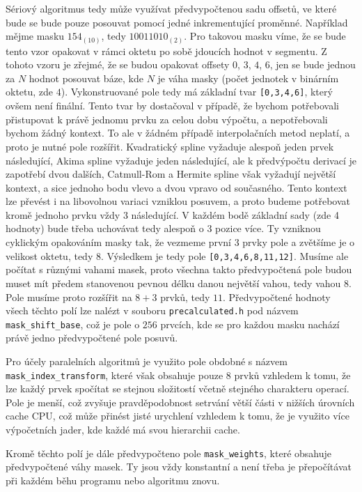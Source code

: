 \documentclass[]{thesiskiv}
\begin{document}
Sériový algoritmus tedy může využívat předvypočtenou sadu offsetů, ve které bude se bude pouze posouvat pomocí jedné inkrementující proměnné. Například mějme masku $154_{(10)}$, tedy $10011010_{(2)}$. Pro takovou masku víme, že se bude tento vzor opakovat v rámci oktetu po sobě jdoucích hodnot v segmentu. Z tohoto vzoru je zřejmé, že se budou opakovat offsety $0$, $3$, $4$, $6$, jen se bude jednou za $N$ hodnot posouvat báze, kde $N$ je váha masky (počet jednotek v binárním oktetu, zde $4$). Vykonstruované pole tedy má základní tvar \texttt{[0,3,4,6]}, který ovšem není finální. Tento tvar by dostačoval v případě, že bychom potřebovali přistupovat k právě jednomu prvku za celou dobu výpočtu, a nepotřebovali bychom žádný kontext. To ale v žádném případě interpolačních metod neplatí, a proto je nutné pole rozšířit. Kvadratický spline vyžaduje alespoň jeden prvek následující, Akima spline vyžaduje jeden následující, ale k předvýpočtu derivací je zapotřebí dvou dalších, Catmull-Rom a Hermite spline však vyžadují největší kontext, a sice jednoho bodu vlevo a dvou vpravo od současného. Tento kontext lze převést i na libovolnou variaci vzniklou posuvem, a proto budeme potřebovat kromě jednoho prvku vždy 3 následující. V každém bodě základní sady (zde 4 hodnoty) bude třeba uchovávat tedy alespoň o 3 pozice více. Ty vzniknou cyklickým opakováním masky tak, že vezmeme první 3 prvky pole a zvětšíme je o velikost oktetu, tedy $8$. Výsledkem je tedy pole \texttt{[0,3,4,6,8,11,12]}. Musíme ale počítat s různými vahami masek, proto všechna takto předvypočtená pole budou muset mít předem stanovenou pevnou délku danou největší vahou, tedy vahou $8$. Pole musíme proto rozšířit na $8 + 3$ prvků, tedy $11$. Předvypočtené hodnoty všech těchto polí lze nalézt v souboru \texttt{precalculated.h} pod názvem \texttt{mask\_shift\_base}, což je pole o $256$ prvcích, kde se pro každou masku nachází právě jedno předvypočtené pole posuvů.

Pro účely paralelních algoritmů je využito pole obdobné s názvem\\ \texttt{mask\_index\_transform}, které však obsahuje pouze $8$ prvků vzhledem k tomu, že lze každý prvek spočítat se stejnou složitostí včetně stejného charakteru operací. Pole je menší, což zvyšuje pravděpodobnost setrvání větší části v nižších úrovních cache CPU, což může přinést jisté urychlení vzhledem k tomu, že je využito více výpočetních jader, kde každé má svou hierarchii cache.

Kromě těchto polí je dále předvypočteno pole \texttt{mask\_weights}, které obsahuje předvypočtené váhy masek. Ty jsou vždy konstantní a není třeba je přepočítávat při každém běhu programu nebo algoritmu znovu.
\end{document}
